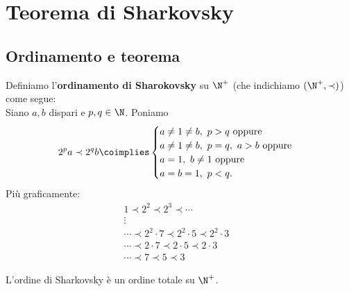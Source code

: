 \section{Teorema di Sharkovsky}
\subsection{Ordinamento e teorema}
\begin{definition}
Definiamo l'\textbf{ordinamento di Sharokovsky} su $\N^+$ (che indichiamo $(\N^+,\prec)$) come segue:\\ 
Siano $a,b$ dispari e $p,q\in\N$. Poniamo
\[2^pa\prec 2^qb\coimplies \begin{cases}
a\neq 1\neq b,\ p>q\text{ oppure}\\
a\neq 1\neq b,\ p=q,\ a>b\text{ oppure}\\
a=1,\ b\neq 1\text{ oppure}\\
a=b=1,\ p<q.
\end{cases}\]
Pi\`u graficamente:
\begin{align*}
1\prec2^2\prec 2^3\prec\cdots&\\
\vdots&\\
\cdots\prec2^2\cdot7\prec2^2\cdot5\prec2^2\cdot3&\\
\cdots\prec2\cdot7\prec2\cdot5\prec2\cdot3&\\
\cdots\prec7\prec5\prec3&
\end{align*}
\end{definition}
\begin{remark}
L'ordine di Sharkovsky \`e un ordine totale su $\N^+$.
\end{remark}

